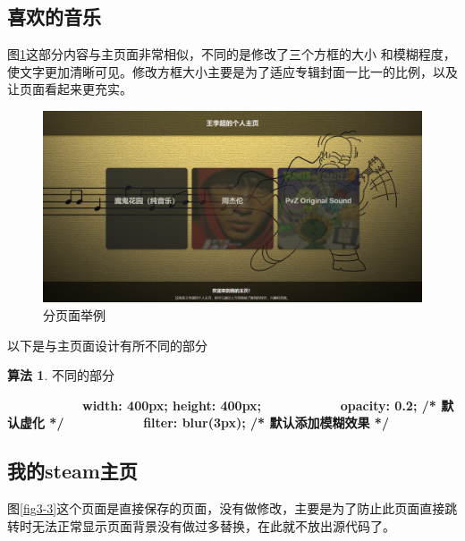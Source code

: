 \documentclass[supercite]{Experimental_Report}
\theoremstyle{definition}
\newtheorem{alg}{算法}[section]
\begin{document}
\subsection{喜欢的音乐}

图\ref{fig3-2}这部分内容与主页面非常相似，不同的是修改了三个方框的大小 和模糊程度，使文字更加清晰可见。修改方框大小主要是为了适应专辑封面一比一的比例，以及让页面看起来更充实。

\begin{figure}[htb]
	\begin{center}
		\includegraphics[scale=0.30]{images/3-2.png}
		\caption{分页面举例}
		\label{fig3-2}
	\end{center}
\end{figure}

以下是与主页面设计有所不同的部分
\begin{shaded*}
	\begin{alg}{不同的部分}
		\label{alg:1}
		\begin{algorithmic}
			\State \ \ \ \ \ \ \ \ \ \ \ \ \textbf{width: 400px;  height: 400px; }
			\State \ \ \ \ \ \ \ \ \ \ \ \ \textbf{opacity: 0.2; /* 默认虚化 */}
			\State \ \ \ \ \ \ \ \ \ \ \ \ \textbf{filter: blur(3px); /* 默认添加模糊效果 */}
		\end{algorithmic}
	\end{alg}
	\end{shaded*}

\subsection{我的steam主页}

图\ref{fig3-3}这个页面是直接保存的页面，没有做修改，主要是为了防止此页面直接跳转时无法正常显示页面背景没有做过多替换，在此就不放出源代码了。
\end{document}
